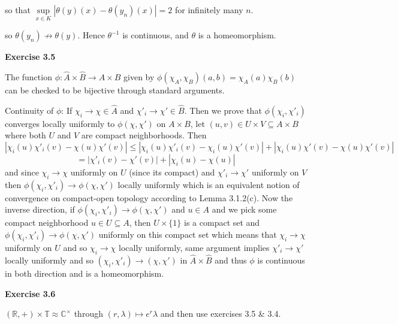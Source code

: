 \documentclass{article}
\begin{document}
so that $\sup \limits_{x \in K} |\theta(y)(x)-\theta(y_n)(x)| = 2$ for infinitely many $n$.

so $\theta(y_n)\not\to\theta(y)$. Hence $\theta^{-1}$ is continuous, and $\theta$ is a homeomorphism.

\vspace{0.5cm}

\textbf{Exercise 3.5}

\vspace{0.5cm}

The function $\phi :\widehat A \times \widehat B \rightarrow \widehat{A \times B}$ given by $\phi(\chi_A, \chi_B)(a,b) = \chi_A(a)\chi_B(b)$ can be checked to be bijective through standard arguments. 

\vspace{0.3cm}

Continuity of $\phi$: If $\chi_i \rightarrow \chi \in \widehat A$ and $\chi'_i \rightarrow \chi' \in \widehat B$. Then we prove that $\phi(\chi_i, \chi'_i)$ converges locally uniformly to $\phi(\chi, \chi')$ on $A \times B$, let $(u,v) \in U \times V \subseteq A \times B$ where both $U$ and $V$ are compact neighborhoods. Then 
$$|\chi_i(u)\chi'_i(v) - \chi(u)\chi'(v)| \leq |\chi_i(u)\chi'_i(v) - \chi_i(u)\chi'(v)| + |\chi_i(u)\chi'(v) - \chi(u)\chi'(v)|$$
$$=|\chi'_i(v) - \chi'(v)| + |\chi_i(u) - \chi(u)| $$
and since $\chi_i \rightarrow \chi$ uniformly on $U$ (since its compact) and $\chi'_i \rightarrow \chi'$ uniformly on $V$ then $\phi(\chi_i, \chi'_i) \rightarrow \phi(\chi,\chi')$ locally uniformly which is an equivalent notion of convergence on compact-open topology according to Lemma 3.1.2(c). Now the inverse direction, if $\phi(\chi_i, \chi'_i) \rightarrow \phi(\chi,\chi')$ and $u \in A$ and we pick some compact neighborhood $u \in U \subseteq A$, then $U \times \{1\}$ is a compact set and $\phi(\chi_i, \chi'_i) \rightarrow \phi(\chi,\chi')$ uniformly on this compact set which means that $\chi_i \rightarrow \chi$ uniformly on $U$ and so $\chi_i \rightarrow \chi$ locally uniformly, same argument implies $\chi'_i \rightarrow \chi'$ locally uniformly and so $(\chi_i, \chi'_i) \rightarrow(\chi, \chi')$ in $\widehat A \times \widehat B$ and thus $\phi$ is continuous in both direction and is a homeomorphism.

\vspace{0.5cm}

\textbf{Exercise 3.6}

\vspace{0.5cm}

$(\mathbb R,+) \times \mathbb T \approx \mathbb C^{\times}$ through $(r,\lambda) \mapsto e^r\lambda$ and then use exercises 3.5 \& 3.4.
\end{document}
